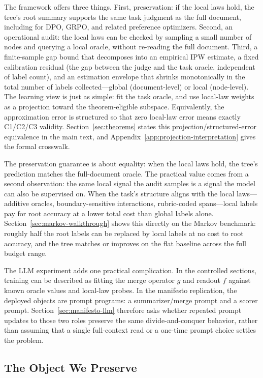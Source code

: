 The framework offers three things. First, preservation: if the local laws hold, the tree's root summary supports the same task judgment as the full document, including for DPO, GRPO, and related preference optimizers. Second, an operational audit: the local laws can be checked by sampling a small number of nodes and querying a local oracle, without re-reading the full document. Third, a finite-sample gap bound that decomposes into an empirical IPW estimate, a fixed calibration residual (the gap between the judge and the task oracle, independent of label count), and an estimation envelope that shrinks monotonically in the total number of labels collected---global (document-level) or local (node-level). The learning view is just as simple: fit the task oracle, and use local-law weights as a projection toward the theorem-eligible subspace. Equivalently, the approximation error is structured so that zero local-law error means exactly C1/C2/C3 validity. Section~\ref{sec:theorems} states this projection/structured-error equivalence in the main text, and Appendix~\ref{app:projection-interpretation} gives the formal crosswalk.

The preservation guarantee is about equality: when the local laws hold, the tree's prediction matches the full-document oracle. The practical value comes from a second observation: the same local signal the audit samples is a signal the model can also be supervised on. When the task's structure aligns with the local laws---additive oracles, boundary-sensitive interactions, rubric-coded spans---local labels pay for root accuracy at a lower total cost than global labels alone. Section~\ref{sec:markov-walkthrough} shows this directly on the Markov benchmark: roughly half the root labels can be replaced by local labels at no cost to root accuracy, and the tree matches or improves on the flat baseline across the full budget range.

The LLM experiment adds one practical complication. In the controlled
sections, training can be described as fitting the merge operator $g$ and
readout $f$ against known oracle values and local-law probes. In the
manifesto replication, the deployed objects are prompt programs: a
summarizer/merge prompt and a scorer prompt. Section~\ref{sec:manifesto-llm}
therefore asks whether repeated prompt updates to those two roles preserve
the same divide-and-conquer behavior, rather than assuming that a
single full-context read or a one-time prompt choice settles the problem.

\subsection{The Object We Preserve}

